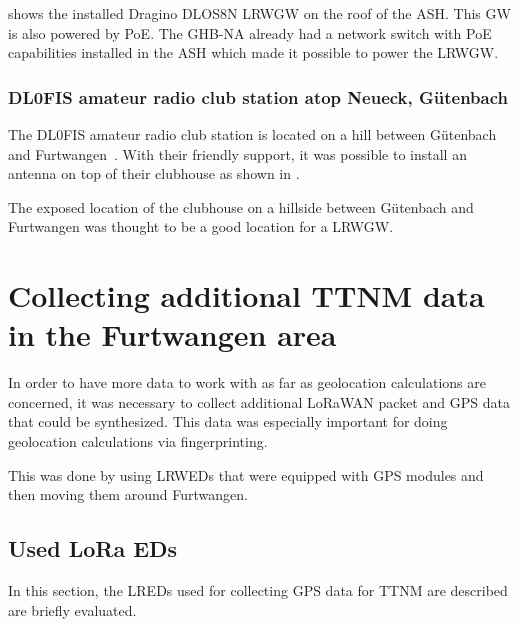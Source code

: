  shows the installed Dragino DLOS8N \acl{LRWGW} on the roof of the \ac{ASH}.
This \acl{GW} is also powered by \ac{PoE}.
The \acl{GHB-NA} already had a network switch with \ac{PoE} capabilities installed in the \ac{ASH} which made it possible to power the \acl{LRWGW}.

\subsubsection{DL0FIS amateur radio club station atop Neueck, Gütenbach}

The DL0FIS amateur radio club station is located on a hill between Gütenbach and Furtwangen~\cite{dl0fis_clubstation_2023}.
With their friendly support, it was possible to install an antenna on top of their clubhouse as shown in .

The exposed location of the clubhouse on a hillside between Gütenbach and Furtwangen was thought to be a good location for a \acl{LRWGW}.

\section{Collecting additional \acl{TTNM} data in the Furtwangen area}\label{sec:collecting-additional-ttnm-data}

In order to have more data to work with as far as geolocation calculations are concerned, it was necessary to collect additional \ac{LoRaWAN} packet and \ac{GPS} data that could be synthesized.
This data was especially important for doing geolocation calculations via fingerprinting.

This was done by using \aclp{LRWED} that were equipped with \ac{GPS} modules and then moving them around Furtwangen.

\subsection{Used \acs{LoRa} \aclp{ED}}\label{subsec:used-lora-devices}

In this section, the \aclp{LRED} used for collecting \ac{GPS} data for \ac{TTNM} are described are briefly evaluated.

